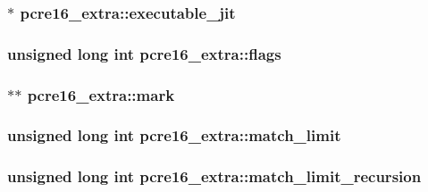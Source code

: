 \subsubsection[{\texorpdfstring{executable\+\_\+jit}{executable_jit}}]{$\ast$ pcre16\+\_\+extra\+::executable\+\_\+jit}\hypertarget{structpcre16__extra_ab0200b2bd6d0ad1dbe7255505e818f1b}{}\label{structpcre16__extra_ab0200b2bd6d0ad1dbe7255505e818f1b}
\subsubsection[{\texorpdfstring{flags}{flags}}]{\setlength{\rightskip}{0pt plus 5cm}unsigned long {\bf int} pcre16\+\_\+extra\+::flags}\hypertarget{structpcre16__extra_aae98750210cd8fd99d00ad7b92c02f62}{}\label{structpcre16__extra_aae98750210cd8fd99d00ad7b92c02f62}
\subsubsection[{\texorpdfstring{mark}{mark}}]{$\ast$$\ast$ pcre16\+\_\+extra\+::mark}\hypertarget{structpcre16__extra_a510cc828d8c06aa14d22b5743d2df5f7}{}\label{structpcre16__extra_a510cc828d8c06aa14d22b5743d2df5f7}
\subsubsection[{\texorpdfstring{match\+\_\+limit}{match_limit}}]{\setlength{\rightskip}{0pt plus 5cm}unsigned long {\bf int} pcre16\+\_\+extra\+::match\+\_\+limit}\hypertarget{structpcre16__extra_ac00b845a071e8ba16d06cac54078b096}{}\label{structpcre16__extra_ac00b845a071e8ba16d06cac54078b096}
\subsubsection[{\texorpdfstring{match\+\_\+limit\+\_\+recursion}{match_limit_recursion}}]{\setlength{\rightskip}{0pt plus 5cm}unsigned long {\bf int} pcre16\+\_\+extra\+::match\+\_\+limit\+\_\+recursion}\hypertarget{structpcre16__extra_a271e8501fa0b0f5837ed5d9a3244c78b}{}\label{structpcre16__extra_a271e8501fa0b0f5837ed5d9a3244c78b}

